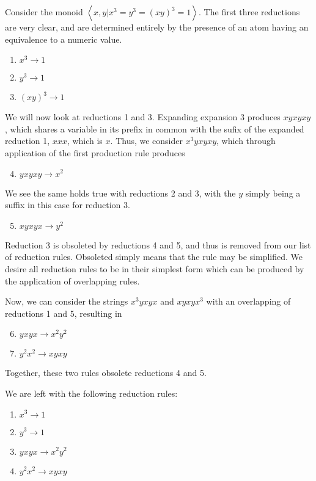 \begin{example}
	Consider the monoid $\left<x,y|x^3=y^3=(xy)^3=1\right>$. The first three reductions are very clear, and are determined entirely by the presence of an atom having an equivalence to a numeric value.
	\begin{enumerate}
		\item $x^3 \rightarrow 1$
		\item $y^3 \rightarrow 1$
		\item $(xy)^3 \rightarrow 1$
	\end{enumerate}
	We will now look at reductions 1 and 3. Expanding expansion 3 produces $xyxyxy$, which shares a variable in its prefix in common with the sufix of the expanded reduction 1, $xxx$, which is $x$. Thus, we consider $x^3yxyxy$, which through application of the first production rule produces 
	\begin{enumerate}
		\setcounter{enumi}{3}
		\item $yxyxy \rightarrow x^2$
	\end{enumerate}
	We see the same holds true with reductions 2 and 3, with the $y$ simply being a suffix in this case for reduction 3.
	\begin{enumerate}
		\setcounter{enumi}{4}
		\item $xyxyx \rightarrow y^2$
	\end{enumerate}
	Reduction 3 is obsoleted by reductions 4 and 5, and thus is removed from our list of reduction rules. Obsoleted simply means that the rule may be simplified. We desire all reduction rules to be in their simplest form which can be produced by the application of overlapping rules.

	Now, we can consider the strings $x^3yxyx$ and $xyxyx^3$ with an overlapping of reductions 1 and 5, resulting in
	\begin{enumerate}
		\setcounter{enumi}{5}
		\item $yxyx \rightarrow x^2y^2$
		\item $y^2x^2 \rightarrow xyxy$
	\end{enumerate}
	Together, these two rules obsolete reductions 4 and 5.	

	We are left with the following reduction rules:
	\begin{enumerate}
		\item $x^3 \rightarrow 1$
		\item $y^3 \rightarrow 1$
		\item $yxyx \rightarrow x^2y^2$
		\item $y^2x^2 \rightarrow xyxy$
	\end{enumerate}

\end{example}

